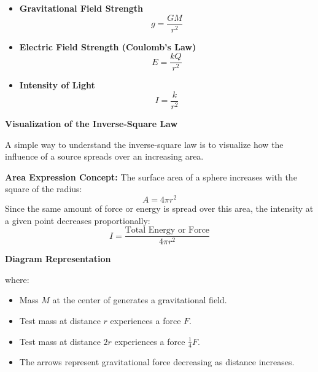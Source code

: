 {\begin{itemize}
\begin{equation*}
        F = \frac{GMm}{r^2}
    \end{equation*}
    \item \textbf{Gravitational Field Strength}
    \begin{equation*}
        g = \frac{GM}{r^2}
    \end{equation*}
    \item \textbf{Electric Field Strength (Coulomb's Law)}
    \begin{equation*}
        E = \frac{kQ}{r^2}
    \end{equation*}
    \item \textbf{Intensity of Light}
    \begin{equation*}
        I = \frac{k}{r^2}
    \end{equation*}
\end{itemize} \par
\textbf{Visualization of the Inverse-Square Law} \par
A simple way to understand the inverse-square law is to visualize how the influence of a source spreads over an increasing area.
\par
\textbf{Area Expression Concept:} The surface area of a sphere increases with the square of the radius:
\begin{equation*}
    A = 4 \pi r^2
\end{equation*}
Since the same amount of force or energy is spread over this area, the intensity at a given point decreases proportionally:
\begin{equation*}
    I = \frac{\text{Total Energy or Force}}{4 \pi r^2}
\end{equation*} \par
\textbf{Diagram Representation}
\begin{center}
\end{center}
where:
\begin{itemize}
    \item Mass $M$ at the center of generates a gravitational field.
    \item Test mass at distance $r$ experiences a force $F$.
    \item Test mass at distance $2r$ experiences a force $\frac{1}{4}F$.
    \item The arrows represent gravitational force decreasing as distance increases.
\end{itemize}}

